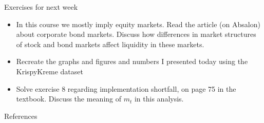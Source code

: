\documentclass[english,10pt]{beamer}
\begin{document}
\begin{frame}{Exercises for next week}
	\begin{itemize}
		\item In this course we mostly imply equity markets. Read the article (on Absalon) about corporate bond markets. Discuss how differences in market structures of stock and bond markets affect liquidity in these markets.
		\item Recreate the graphs and figures and numbers I presented today using the KrispyKreme dataset
		\item Solve exercise 8 regarding implementation shortfall, on page 75 in the textbook.
		Discuss the meaning of $m_t$ in this analysis.
	\end{itemize}
\end{frame}




\appendix
\begin{frame}[allowframebreaks]{References}
	
	
\end{frame}
\end{document}
